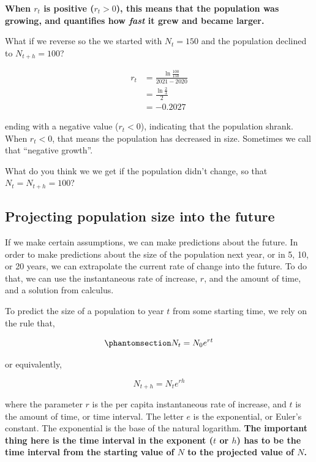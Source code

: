 \documentclass[
  letterpaper,
  DIV=11,
  numbers=noendperiod]{scrreprt}
\begin{document}
\textbf{When \(r_t\) is positive (\(r_t > 0\)), this means that the
population was growing, and quantifies how \emph{fast} it grew and
became larger.}

What if we reverse so the we started with \(N_t = 150\) and the
population declined to \(N_{t+h} = 100\)?

\begin{align*}
r_t &= \frac{\ln \frac{100}{150}}{2021 - 2020}\\
 &=\frac{\ln \frac{2}{3}}{2}\\
 &= -0.2027
\end{align*}

ending with a negative value (\(r_t < 0\)), indicating that the
population shrank. When \(r_t < 0\), that means the population has
decreased in size. Sometimes we call that ``negative growth''.

What do you think we we get if the population didn't change, so that
\(N_t = N_{t+h} = 100\)?

\subsection{Projecting population size into the
future}\label{projecting-population-size-into-the-future}

If we make certain assumptions, we can make predictions about the
future. In order to make predictions about the size of the population
next year, or in 5, 10, or 20 years, we can extrapolate the current rate
of change into the future. To do that, we can use the instantaneous rate
of increase, \(r\), and the amount of time, and a solution from
calculus.

To predict the size of a population to year \(t\) from some starting
time, we rely on the rule that,

\begin{equation}\phantomsection\label{eq-Ntproj}{N_t = N_0 e^{rt}}\end{equation}

or equivalently,

\[N_{t+h} = N_t e^{rh}\]

where the parameter \(r\) is the per capita instantaneous rate of
increase, and \(t\) is the amount of time, or time interval. The letter
\(e\) is the exponential, or Euler's constant. The exponential is the
base of the natural logarithm. \textbf{The important thing here is the
time interval in the exponent (\(t\) or \(h\)) has to be the time
interval from the starting value of \(N\) to the projected value of
\(N\).}
\end{document}
